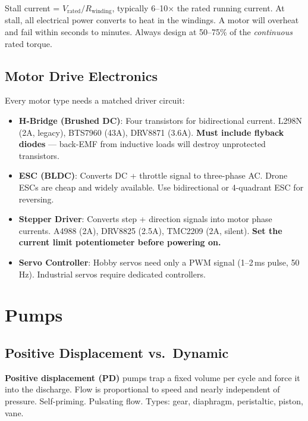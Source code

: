 \documentclass[11pt,letterpaper,twoside,openany]{book}
\begin{document}
\begin{warningbox}
Stall current = $V_{\text{rated}} / R_{\text{winding}}$, typically 6--10$\times$ the rated running current. At stall, all electrical power converts to heat in the windings. A motor will overheat and fail within seconds to minutes. Always design at 50--75\% of the \emph{continuous} rated torque.
\end{warningbox}

\subsection{Motor Drive Electronics}
\label{sec:motor_drivers}

Every motor type needs a matched driver circuit:

\begin{itemize}[leftmargin=1.5em]
  \item \textbf{H-Bridge (Brushed DC)}: Four transistors for bidirectional current. L298N (2A, legacy), BTS7960 (43A), DRV8871 (3.6A). \textbf{Must include flyback diodes} --- back-EMF from inductive loads will destroy unprotected transistors.
  \item \textbf{ESC (BLDC)}: Converts DC + throttle signal to three-phase AC. Drone ESCs are cheap and widely available. Use bidirectional or 4-quadrant ESC for reversing.
  \item \textbf{Stepper Driver}: Converts step + direction signals into motor phase currents. A4988 (2A), DRV8825 (2.5A), TMC2209 (2A, silent). \textbf{Set the current limit potentiometer before powering on.}
  \item \textbf{Servo Controller}: Hobby servos need only a PWM signal (1--2\,ms pulse, 50\,Hz). Industrial servos require dedicated controllers.
\end{itemize}


\FloatBarrier
\section{Pumps}

\subsection{Positive Displacement vs.\ Dynamic}

\textbf{Positive displacement (PD)} pumps trap a fixed volume per cycle and force it into the discharge. Flow is proportional to speed and nearly independent of pressure. Self-priming. Pulsating flow. Types: gear, diaphragm, peristaltic, piston, vane.
\end{document}
